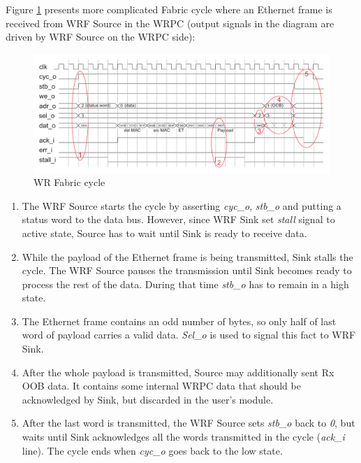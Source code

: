 Figure \ref{fig:fabric:cyc} presents more complicated Fabric cycle where an
Ethernet frame is received from WRF Source in the WRPC (output signals in the
diagram are driven by WRF Source on the WRPC side): 

\begin{figure}
  \begin{center}
    \includegraphics[width=\textwidth]{fig/basic_wrf_cycle.pdf}
    \caption{WR Fabric cycle}
    \label{fig:fabric:cyc}
  \end{center}
\end{figure}
\begin{enumerate}
  \item The WRF Source starts the cycle by asserting \emph{cyc\_o}, \emph{stb\_o}
    and putting a status word to the data bus. However, since WRF Sink set 
    \emph{stall} signal to active state, Source has to wait until Sink is ready
    to receive data.
  \item While the payload of the Ethernet frame is being transmitted, Sink
    stalls the cycle. The WRF Source pauses the transmission until Sink becomes
    ready to process the rest of the data. During that time \emph{stb\_o} has to
    remain in a high state.
  \item The Ethernet frame contains an odd number of bytes, so only half of last
    word of payload carries a valid data. \emph{Sel\_o} is used to signal this
    fact to WRF Sink.
  \item After the whole payload is transmitted, Source may additionally sent Rx
    OOB data. It contains some internal WRPC data that should be acknowledged
    by Sink, but discarded in the user's module.
  \item After the last word is transmitted, the WRF Source sets \emph{stb\_o} back
    to \emph{0}, but waits until Sink acknowledges all the words transmitted in
    the cycle (\emph{ack\_i} line). The cycle ends when \emph{cyc\_o} goes back
    to the low state.
\end{enumerate}

